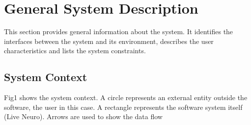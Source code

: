 \documentclass[12pt]{article}
\begin{document}
\section{General System Description}


This section provides general information about the system.  It identifies the
interfaces between the system and its environment, describes the user
characteristics and lists the system constraints.
%

\subsection{System Context}

Fig1 shows the system context. A circle represents an external entity outside
the software, the user in this case. A rectangle represents the software system itself
(Live Neuro). Arrows are used to show the data flow
\end{document}

